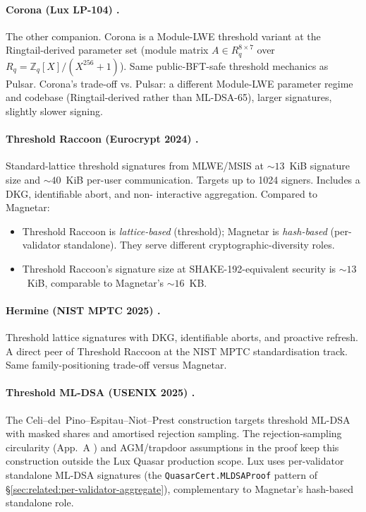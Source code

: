 \paragraph{Corona (Lux LP-104)
\cite{lp104corona,ringtail}.}
The other companion. Corona is a Module-LWE threshold variant at
the Ringtail-derived parameter set (module matrix
$A \in R_q^{8\times7}$ over $R_q = \mathbb{Z}_q[X]/(X^{256}+1)$).
Same public-BFT-safe threshold mechanics as Pulsar. Corona's
trade-off vs. Pulsar: a different Module-LWE parameter regime and
codebase (Ringtail-derived rather than ML-DSA-65), larger
signatures, slightly slower signing.

\paragraph{Threshold Raccoon (Eurocrypt 2024) \cite{thresholdraccoon}.}
Standard-lattice threshold signatures from MLWE/MSIS at $\sim 13$~KiB
signature size and $\sim 40$~KiB per-user communication. Targets up
to 1024 signers. Includes a DKG, identifiable abort, and non-
interactive aggregation. Compared to Magnetar:
\begin{itemize}[nosep,leftmargin=2em]
  \item Threshold Raccoon is \emph{lattice-based} (threshold);
        Magnetar is \emph{hash-based} (per-validator standalone).
        They serve different cryptographic-diversity roles.
  \item Threshold Raccoon's signature size at SHAKE-192-equivalent
        security is $\sim 13$~KiB, comparable to Magnetar's
        $\sim 16$~KB.
\end{itemize}

\paragraph{Hermine (NIST MPTC 2025) \cite{hermine}.} Threshold
lattice signatures with DKG, identifiable aborts, and proactive
refresh. A direct peer of Threshold Raccoon at the NIST MPTC
standardisation track. Same family-positioning trade-off versus
Magnetar.

\paragraph{Threshold ML-DSA (USENIX 2025) \cite{tmldsa2025}.} The
Celi--del~Pino--Espitau--Niot--Prest construction targets
threshold ML-DSA with masked shares and amortised rejection
sampling. The rejection-sampling circularity
(App.~A \cite{quasarcertsoundness}) and AGM/trapdoor assumptions
in the proof keep this construction outside the Lux Quasar
production scope. Lux uses per-validator standalone ML-DSA
signatures (the \texttt{QuasarCert.MLDSAProof} pattern of
\S\ref{sec:related:per-validator-aggregate}), complementary to
Magnetar's hash-based standalone role.

